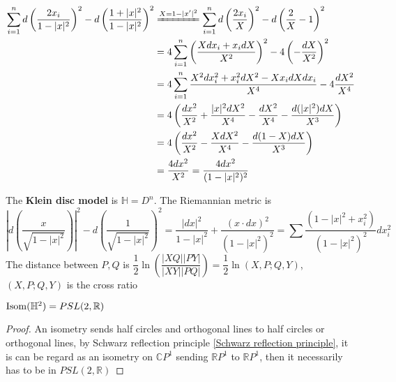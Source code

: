 \documentclass[main]{subfiles}
\begin{document}
\begin{definition}
\begin{align*}
\sum_{i=1}^nd\left(\dfrac{2x_i}{1-|x|^2}\right)^2-d\left(\dfrac{1+|x|^2}{1-|x|^2}\right)^2
&\xequal{X=1-|x'|^2}
\sum_{i=1}^nd\left(\dfrac{2x_i}{X}\right)^2-d\left(\dfrac{2}{X}-1\right)^2 \\
&=4\sum_{i=1}^n\left(\dfrac{Xdx_i+x_idX}{X^2}\right)^2-4\left(-\dfrac{dX}{X^2}\right)^2 \\
&=4\sum_{i=1}^n\dfrac{X^2dx_i^2+x_i^2dX^2-Xx_idXdx_i}{X^4}-4\dfrac{dX^2}{X^4} \\
&=4\left(\dfrac{dx^2}{X^2}+\dfrac{|x|^2dX^2}{X^4}-\dfrac{dX^2}{X^4}-\dfrac{d(|x|^2)dX}{X^3}\right) \\
&=4\left(\dfrac{dx^2}{X^2}-\dfrac{XdX^2}{X^4}-\dfrac{d(1-X)dX}{X^3}\right) \\
&=\frac{4dx^2}{X^2}=\frac{4dx^2}{(1-|x|^2)^2}
\end{align*}

The \textbf{Klein disc model} is $\mathbb H=D^n$. The Riemannian metric is
\[\left|d\left(\frac{x}{\sqrt{1-|x|^2}}\right)\right|^2-d\left(\frac{1}{\sqrt{1-|x|^2}}\right)^2=\frac{|dx|^2}{1-|x|^2}+\frac{(x\cdot dx)^2}{(1-|x|^2)^2}=\sum\frac{(1-|x|^2+x_i^2)}{(1-|x|^2)^2}dx_i^2\]
The distance between $P,Q$ is $\dfrac{1}{2}\ln\left(\dfrac{|XQ||PY|}{|XY||PQ|}\right)=\dfrac{1}{2}\ln\left(X,P;Q,Y\right)$, $(X,P;Q,Y)$ is the cross ratio
\begin{center}
\end{center}
\end{definition}

\begin{theorem}
$\operatorname{Isom}(\mathbb H^2)=PSL(2,\mathbb R)$
\end{theorem}

\begin{proof}
An isometry sends half circles and orthogonal lines to half circles or orthogonal lines, by Schwarz reflection principle \ref{Schwarz reflection principle}, it is can be regard as an isometry on $\mathbb CP^1$ sending $\mathbb RP^1$ to $\mathbb RP^1$, then it necessarily has to be in $PSL(2,\mathbb R)$
\end{proof}
\end{document}
